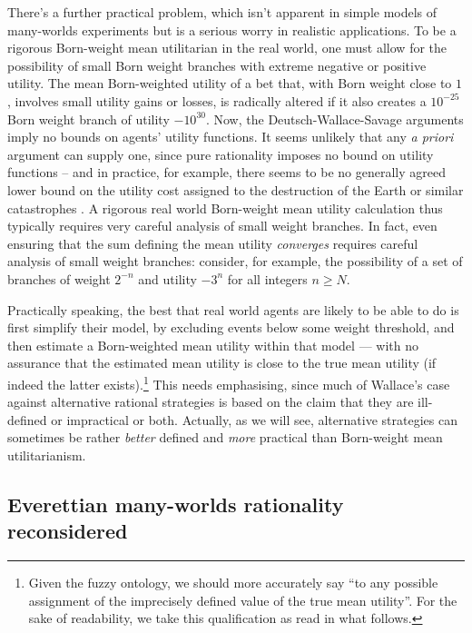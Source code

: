 \documentclass[aps,
pra,epsfig,12pt,nofootinbib]{revtex4}
\begin{document}
There's a further practical problem, which isn't apparent in simple
models of many-worlds experiments but is a serious worry in 
realistic applications.  To be a rigorous Born-weight
mean utilitarian in the real world, one must allow for the possibility of   
small Born weight branches with extreme negative or positive utility.
The mean Born-weighted utility of a bet that, with 
Born weight close to $1$, involves 
small utility gains or 
losses, is radically altered if it also creates a $10^{-25}$ Born weight 
branch of utility $-10^{30}$.   Now, the Deutsch-Wallace-Savage arguments imply
no bounds on agents' utility functions.   It seems unlikely that
any {\it a priori} argument can supply one, since pure rationality 
imposes no bound on utility functions -- and in practice, for example,
there seems to be no generally agreed lower bound on the utility cost 
assigned to the destruction of the Earth or similar catastrophes \cite{akrisk}. 
A rigorous real world Born-weight mean utility calculation 
thus typically requires very careful analysis of small weight branches.   
In fact, even ensuring that the sum defining the mean 
utility {\it converges} requires
careful analysis of small weight branches: consider, for example,
the possibility of a set 
of branches of weight $2^{-n}$ and utility $-3^n$ for all integers $n \geq N$.  

Practically speaking, the best that real world agents are likely to be able
to do is first simplify their model, by excluding events below
some weight threshold, and then estimate a Born-weighted mean 
utility within that model --- with no assurance that the estimated 
mean utility is close to the true mean utility (if indeed the
latter exists).\footnote{
Given the fuzzy ontology, we should more accurately
say ``to any possible assignment of the imprecisely
defined value of the true mean utility''.   For the sake of 
readability, we take this qualification as read in what follows.} 
This needs emphasising, since much of Wallace's case 
against alternative rational strategies is based on the claim 
that they are ill-defined or impractical or both.  
Actually, as we will see, alternative
strategies can sometimes
be rather {\it better} defined and {\it more} practical 
than Born-weight mean utilitarianism. 

\subsection{Everettian many-worlds rationality reconsidered}
\end{document}
